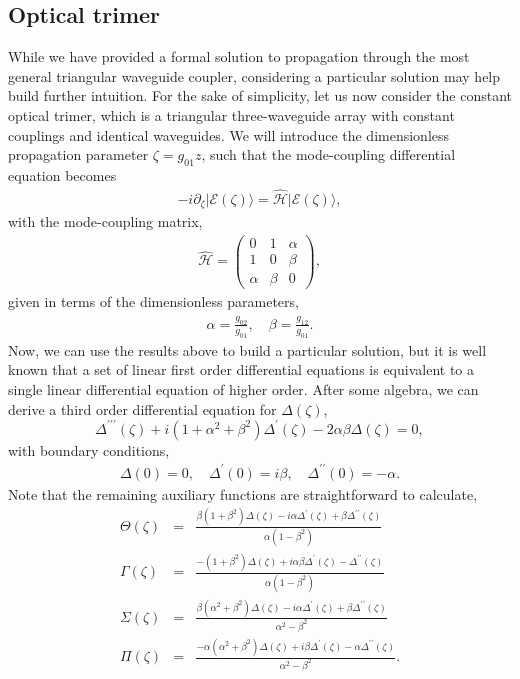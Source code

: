 \documentclass[9pt,twocolumn,twoside]{osajnl}
\begin{document}
\subsection{Optical trimer}
While we have provided a formal solution to propagation through the most general triangular waveguide coupler, considering a particular solution may help build further intuition. 
For the sake of simplicity, let us now consider the constant optical trimer, which is a triangular three-waveguide array with constant couplings and identical waveguides. 
We will introduce the dimensionless propagation parameter $\zeta = g_{01} z$, such that the mode-coupling differential equation becomes 
\begin{eqnarray}
- i \partial_{\zeta} \vert \mathcal{E}(\zeta) \rangle = \hat{\mathcal{H}} \vert \mathcal{E}(\zeta) \rangle, 
\end{eqnarray}
with the mode-coupling matrix,
\begin{eqnarray}
\hat{\mathcal{H}} = \left( \begin{array}{ccc} 
0  & 1 & \alpha  \\
1 & 0 & \beta \\
\alpha & \beta & 0
\end{array} \right), \label{eq:hmlt2}
\end{eqnarray}
given in terms of the dimensionless parameters,
\begin{eqnarray}
\alpha =\frac{g_{02}}{g_{01}}, \quad \beta=\frac{g_{12}}{g_{01}}.
\end{eqnarray}
Now, we can use the results above to build a particular solution, but it is well known that a set of linear first order differential equations is equivalent to a single linear differential equation of higher order.
After some algebra, we can derive a third order differential equation for $\Delta(\zeta)$,
\begin{equation}
\Delta^{\prime\prime\prime}(\zeta) + i(1+\alpha^2+\beta^2)\Delta ^{\prime}(\zeta) -2 \alpha\beta\Delta(\zeta) = 0,\label{eq:ddiff}
\end{equation}
with boundary conditions, 
\begin{eqnarray}
\Delta(0) = 0, \quad \Delta^{\prime}(0) = i\beta, \quad \Delta^{\prime\prime}(0) = -\alpha.
\end{eqnarray}
Note that the remaining auxiliary functions are straightforward to calculate, 
\begin{eqnarray}
\Theta(\zeta)&=& \frac{\beta(1+\beta^2)\Delta(\zeta) - i \alpha\Delta^{\prime}(\zeta)+\beta\Delta^{\prime\prime}(\zeta)}
	{\alpha(1-\beta^2)}  \\
\Gamma(\zeta)&=& \frac{-(1+\beta^2)\Delta(\zeta) +i \alpha\beta\Delta^{\prime}(\zeta)-\Delta^{\prime\prime}(\zeta)}
	{\alpha(1-\beta^2)} \\
\Sigma(\zeta)&=& \frac{\beta(\alpha^2+\beta^2)\Delta(\zeta) -i \alpha\Delta^{\prime}(\zeta)+\beta\Delta^{\prime\prime}(\zeta)}
	{\alpha^2-\beta^2}  \\
\Pi(\zeta)&=& \frac{-\alpha(\alpha^2+\beta^2)\Delta(\zeta) +i \beta\Delta^{\prime}(\zeta)-\alpha\Delta^{\prime\prime}(\zeta)}
	{\alpha^2-\beta^2}.
\end{eqnarray} 
\end{document}
